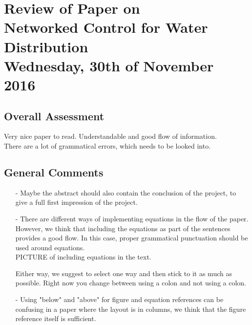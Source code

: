 
\renewcommand{\vec}[1]{\boldsymbol{\mathbf{#1}}}

\renewcommand\chaptername{KAPITEL}
\renewcommand\contentsname{Indhold}
\renewcommand\figurename{Figur}
\renewcommand\tablename{Tabel}

\section*{Review of Paper on\\
Networked Control for Water Distribution\\
\small Wednesday, 30th of November 2016}
\subsection{Overall Assessment}
Very nice paper to read. Understandable and good flow of information. \\
There are a lot of grammatical errors, which needs to be looked into.  
\subsection{General Comments}
\begin{itemize}
	\item[-] Maybe the abstract should also contain the conclusion of the project, to give a full first impression of the project.
	\item[-]
There are different ways of implementing equations in the flow of the paper. However, we think that including the equations as part of the sentences provides a good flow. In this case, proper grammatical punctuation should be used around equations.\\
 PICTURE of including equations in the text. 

Either way, we suggest to select one way and then stick to it as much as possible. Right now you change between using a colon and not using a colon. 
\item[-]Using "below" and "above" for figure and equation references can be confusing in a paper where the layout is in columns, we think that the figure reference itself is sufficient.
\end{itemize}	
